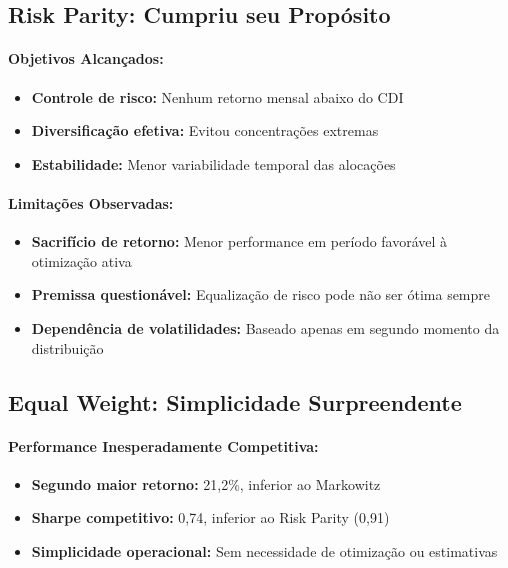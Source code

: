\subsection{Risk Parity: Cumpriu seu Propósito}

\paragraph{Objetivos Alcançados:}
\begin{itemize}
    \item \textbf{Controle de risco:} Nenhum retorno mensal abaixo do CDI
    \item \textbf{Diversificação efetiva:} Evitou concentrações extremas
    \item \textbf{Estabilidade:} Menor variabilidade temporal das alocações
\end{itemize}

\paragraph{Limitações Observadas:}
\begin{itemize}
    \item \textbf{Sacrifício de retorno:} Menor performance em período favorável à otimização ativa
    \item \textbf{Premissa questionável:} Equalização de risco pode não ser ótima sempre
    \item \textbf{Dependência de volatilidades:} Baseado apenas em segundo momento da distribuição
\end{itemize}

\subsection{Equal Weight: Simplicidade Surpreendente}

\paragraph{Performance Inesperadamente Competitiva:}
\begin{itemize}
    \item \textbf{Segundo maior retorno:} 21,2\%, inferior ao Markowitz
    \item \textbf{Sharpe competitivo:} 0,74, inferior ao Risk Parity (0,91)
    \item \textbf{Simplicidade operacional:} Sem necessidade de otimização ou estimativas
\end{itemize}

